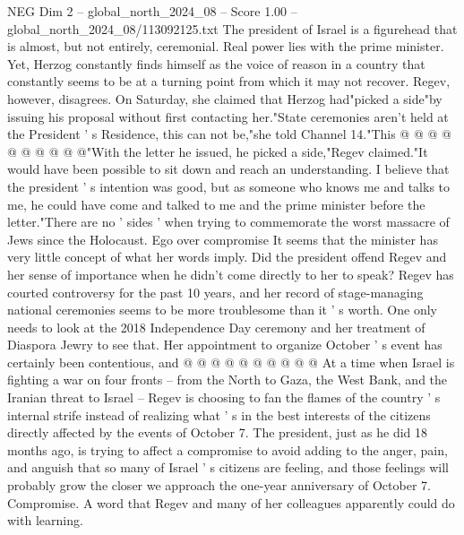 \begin{textsample}{NEG Dim 2 – global\_north\_2024\_08 – Score 1.00 – global\_north\_2024\_08/113092125.txt}
The president of Israel is a figurehead that is almost, but not entirely, ceremonial.
Real power lies with the prime minister.
Yet, Herzog constantly finds himself as the voice of reason in a country that constantly seems to be at a turning point from which it may not recover.
Regev, however, disagrees.
On Saturday, she claimed that Herzog had"picked a side"by issuing his proposal without first contacting her."State ceremonies aren't held at the President ' s Residence, this can not be,"she told Channel 14."This @ @ @ @ @ @ @ @ @ @"With the letter he issued, he picked a side,"Regev claimed."It would have been possible to sit down and reach an understanding.
I believe that the president ' s intention was good, but as someone who knows me and talks to me, he could have come and talked to me and the prime minister before the letter."There are no ' sides ' when trying to commemorate the worst massacre of Jews since the Holocaust.
Ego over compromise It seems that the minister has very little concept of what her words imply.
Did the president offend Regev and her sense of importance when he didn't come directly to her to speak?
Regev has courted controversy for the past 10 years, and her record of stage-managing national ceremonies seems to be more troublesome than it ' s worth.
One only needs to look at the 2018 Independence Day ceremony and her treatment of Diaspora Jewry to see that.
Her appointment to organize October ' s event has certainly been contentious, and @ @ @ @ @ @ @ @ @ @ At a time when Israel is fighting a war on four fronts -- from the North to Gaza, the West Bank, and the Iranian threat to Israel -- Regev is choosing to fan the flames of the country ' s internal strife instead of realizing what ' s in the best interests of the citizens directly affected by the events of October 7.
The president, just as he did 18 months ago, is trying to affect a compromise to avoid adding to the anger, pain, and anguish that so many of Israel ' s citizens are feeling, and those feelings will probably grow the closer we approach the one-year anniversary of October 7.
Compromise.
A word that Regev and many of her colleagues apparently could do with learning.

\end{textsample}
